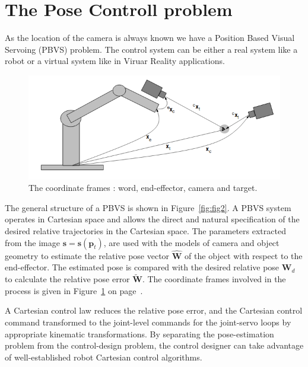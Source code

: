 \documentclass[a4paper,12pt]{article}
\begin{document}
\section{The Pose Controll problem}
As the location of the camera is always known we have a Position Based Visual Servoing (PBVS) problem. The control system can be either a real system like a robot or a virtual system like in Viruar Reality applications.

\begin{figure}[tb]
         \centering
         \includegraphics[width=13cm]{coordsys.png}
         \caption{The coordinate frames : word, end-effector, camera and target.}
 	\label{fig:coord}
\end{figure}

The general structure of a PBVS is shown in Figure~\ref{fig:fig2}. A PBVS system operates in Cartesian space and
allows the direct and natural specification of the desired relative trajectories in the Cartesian space.  The parameters extracted from the image $\mathbf{s} = \mathbf{s}(\mathbf{p}_t)$, are used with the models of camera
and object geometry to estimate the relative pose vector $\widehat{\mathbf{W}}$ of the object with respect to the end-effector. The estimated pose is compared with the desired relative pose $\mathbf{W}_d$ to calculate the relative pose error $\widetilde{\mathbf{W}}$.  The coordinate frames involved in the process is given in Figure~\ref{fig:coord} on page~\pageref{fig:coord}.


A Cartesian control law reduces the relative pose error, and the Cartesian control command transformed to 
the joint-level commands for the joint-servo loops by appropriate kinematic transformations.
By separating the pose-estimation problem from the control-design
problem, the control designer can take advantage of well-established robot Cartesian control algorithms.
 
\end{document}
